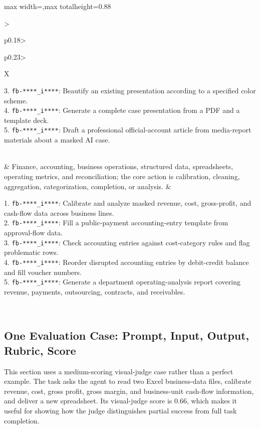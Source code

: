 \documentclass[11pt, a4paper, copyright, frontis]{frontis}
\newcommand{\liteset}{Lite}
\begin{document}
\begin{table}[p]
\begin{adjustbox}{max width=\textwidth,max totalheight=0.88\textheight}
\begin{tabularx}{\textwidth}{>{\raggedright\arraybackslash}p{0.18\textwidth}>{\raggedright\arraybackslash}p{0.23\textwidth}>{\raggedright\arraybackslash}X}
\begin{minipage}[t]{\linewidth}
3. \texttt{fb-****\_i****}: Beautify an existing presentation according to a specified color scheme.\\
4. \texttt{fb-****\_i****}: Generate a complete case presentation from a PDF and a template deck.\\
5. \texttt{fb-****\_i****}: Draft a professional official-account article from media-report materials about a masked AI case.\vspace{1pt}
\end{minipage} \\
\midrule
{}
& Finance, accounting, business operations, structured data, spreadsheets, operating metrics, and reconciliation; the core action is calibration, cleaning, aggregation, categorization, completion, or analysis.
& \begin{minipage}[t]{\linewidth}\vspace{0pt}
1. \texttt{fb-****\_i****}: Calibrate and analyze masked revenue, cost, gross-profit, and cash-flow data across business lines.\\
2. \texttt{fb-****\_i****}: Fill a public-payment accounting-entry template from approval-flow data.\\
3. \texttt{fb-****\_i****}: Check accounting entries against cost-category rules and flag problematic rows.\\
4. \texttt{fb-****\_i****}: Reorder disrupted accounting entries by debit-credit balance and fill voucher numbers.\\
5. \texttt{fb-****\_i****}: Generate a department operating-analysis report covering revenue, payments, outsourcing, contracts, and receivables.\vspace{1pt}
\end{minipage} \\
\bottomrule
\end{tabularx}
\end{adjustbox}
\caption{Representative tasks from the \liteset{} subset by role class. Each row gives the classification boundary and five release-safe prompt excerpts.}
\label{ecblink:tab:case-representative-prompts}
\end{table}

\subsection{One Evaluation Case: Prompt, Input, Output, Rubric, Score}
This section uses a medium-scoring visual-judge case rather than a perfect example. The task asks the agent to read two Excel business-data files, calibrate revenue, cost, gross profit, gross margin, and business-unit cash-flow information, and deliver a new spreadsheet. Its visual-judge score is 0.66, which makes it useful for showing how the judge distinguishes partial success from full task completion.
\end{document}
